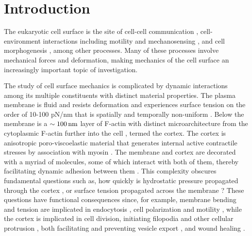
\section{Introduction}



The eukaryotic cell surface is the site of cell-cell communication \cite{Allard:2012gy}, cell-environ\-ment interactions including motility and mechanosensing \cite{Zhu:2013kq}, and cell morphogenesis \cite{Allard:2012if}, among other processes. Many of these processes involve mechanical forces and deformation, making mechanics of the cell surface an increasingly important topic of investigation.

The study of cell surface mechanics is complicated by dynamic interactions among its multiple constituents with distinct material properties. 
The plasma membrane is fluid \cite{Rangamani:2013ce} and resists deformation and experiences surface tension on the order of 10-100 pN/nm \cite{Tinevez:2009bh} that is spatially and temporally non-uniform \cite{Peleg:2011fz}. 
Below the membrane is a $\sim100\,\mbox{nm}$ layer of F-actin with distinct microarchitecture from the cytoplasmic F-actin further into the cell \cite{Clark:2013ef}, termed the cortex. The cortex is anisotropic poro-viscoelastic material \cite{Salbreux:2009fp,Hannezo:2015ba} that generates internal active contractile stresses by association with myosin \cite{Tinevez:2009bh}. 
The membrane and cortex are decorated with a myriad of molecules, some of which interact with both of them, thereby facilitating dynamic adhesion between them \cite{Fritzsche:2014jw}.   
This complexity obscures fundamental questions such as, how quickly is hydrostatic pressure propagated through the cortex \cite{Strychalski:2013eo,Charras:2009dp,Clark:2014fj}, or surface tension propagated across the membrane \cite{Peleg:2011fz,BenFogelson:2014gx,Rangamani:2013ce}?
These questions have functional consequences since, for example, membrane bending and tension are implicated in endocytosis \cite{Liu:2010hla}, cell polarization \cite{Weiner:2007gd} and motility \cite{BenFogelson:2014gx, Yip:2015cb}, while the cortex is implicated in cell division, initiating filopodia and other cellular protrusion \cite{Leijnse:2015fd},  both facilitating and preventing vesicle export \cite{Wollman:2012kha},  and wound healing \cite{Salbreux:2009fp}. 
 

